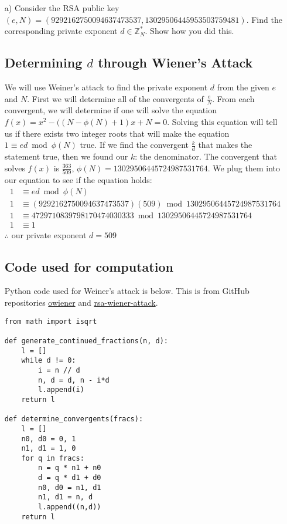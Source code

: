 \documentclass[12pt, letterpaper]{article}
\begin{document}
\begin{itemize}

\item[a)] Consider the RSA public key 
$(e,N) = (9292162750094637473537, 13029506445953503759481)$.
Find the corresponding private exponent $d \in \mathbb{Z}_N^*$.  
Show how you did this. 

\subsection{Determining $d$ through Wiener's Attack}
We will use Weiner's attack to find the private exponent $d$ from the given $e$ and $N$. First we will determine all of the convergents of $\frac{e}{N}$. From each convergent, we will determine if one will solve the equation $f(x)=x^{2} - ((N-\phi(N)+1)x+ N = 0$. Solving this equation will tell us if there exists two integer roots that will make the equation
$1 \equiv ed \bmod \phi(N)$ true. If we find the convergent $\frac{k}{d}$ that makes the statement true, then we found our $k$: the denominator. The convergent that solves $f(x)$ is $\frac{363}{509}$, $\phi(N) = 13029506445724987531764$. We plug them into our equation to see if the equation holds:
\begin{equation*}
	\begin{split}
		1 & \equiv ed \bmod \phi(N)\\
		1 & \equiv (9292162750094637473537)(509) \bmod 13029506445724987531764\\
		1 & \equiv 4729710839798170474030333 \bmod 13029506445724987531764\\
		1 & \equiv 1
	\end{split}
\end{equation*}
$\therefore$ our private exponent $d = 509$
\subsection{Code used for computation}
Python code used for Weiner's attack is below. This is from GitHub repositories \href{https://github.com/orisano/owiener}{owiener} and \href{https://github.com/pablocelayes/rsa-wiener-attack}{rsa-wiener-attack}.
\begin{lstlisting}
from math import isqrt

def generate_continued_fractions(n, d):
    l = []
    while d != 0:
        i = n // d
        n, d = d, n - i*d
        l.append(i)
    return l

def determine_convergents(fracs):
    l = []
    n0, d0 = 0, 1
    n1, d1 = 1, 0
    for q in fracs:
        n = q * n1 + n0
        d = q * d1 + d0
        n0, d0 = n1, d1
        n1, d1 = n, d
        l.append((n,d))
    return l


\end{lstlisting}
\end{itemize}
\end{document}
